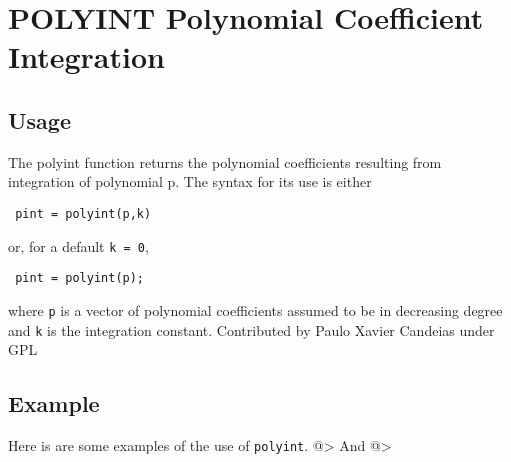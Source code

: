 \section{POLYINT Polynomial Coefficient Integration}

\subsection{Usage}

 The polyint function returns the polynomial coefficients resulting
 from integration of polynomial p. The syntax for its use is either
\begin{verbatim}
 pint = polyint(p,k)
\end{verbatim}
 or, for a default \verb|k = 0|,
\begin{verbatim}
 pint = polyint(p);
\end{verbatim}
 where \verb|p| is a vector of polynomial coefficients assumed to be in
 decreasing degree and \verb|k| is the integration constant.
 Contributed by Paulo Xavier Candeias under GPL
\subsection{Example}

Here is are some examples of the use of \verb|polyint|.
@>
And
@>
